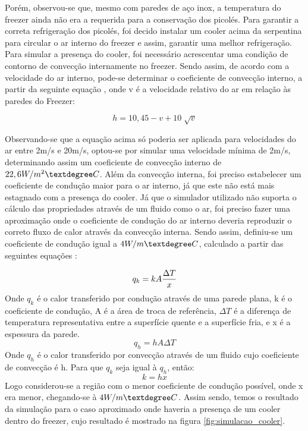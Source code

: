 \begin{itemize}
\par Porém, observou-se que, mesmo com paredes de aço inox, a temperatura do freezer ainda não era a requerida para a conservação dos picolés. Para garantir a correta refrigeração dos picolés, foi decido instalar um cooler acima da serpentina para circular o ar interno do freezer e assim, garantir uma melhor refrigeração. Para simular a presença do cooler, foi necessário acrescentar uma condição de contorno de convecção internamente no freezer. Sendo assim, de acordo com a velocidade do ar interno, pode-se determinar o coeficiente de convecção interno, a partir da seguinte equação \cite{convection}, onde v é a velocidade relativo do ar em relação às paredes do Freezer:

$$
    h = 10,45 - v + 10 \sqrt[]{v}
$$

Observando-se que a equação acima só poderia ser aplicada para velocidades do ar entre 2m/s e 20m/s, optou-se por simular uma velocidade mínima de 2m/s, determinando assim um coeficiente de convecção interno de $22,6 W/m^2\textdegree C $. Além da convecção interna, foi preciso estabelecer um coeficiente de condução maior para o ar interno, já que este não está mais estagnado com a presença do cooler. Já que o simulador utilizado não suporta o cálculo das propriedades através de um fluido como o ar, foi preciso fazer uma aproximação onde o coeficiente de condução do ar interno deveria reproduzir o correto fluxo de calor através da convecção interna. Sendo assim, definiu-se um coeficiente de condução igual a $4 W/m\textdegree C$, calculado a partir das seguintes equações \cite{equacoesCOEF}: 

$$
    q_k = kA {\Delta T\over x}
$$
Onde $q_k$ é o calor transferido por condução através de uma parede plana, k é o coeficiente de condução, A é a área de troca de referência, $ \Delta T$ é a diferença de temperatura representativa entre a superfície quente e a superfície fria, e x é a espessura da parede.
$$
    q_h = hA \Delta T
$$
Onde $q_h$ é o calor transferido por convecção através de um fluido cujo coeficiente de convecção é h. 
Para que $q_k$ seja igual à $q_h$, então:
$$
    k = hx
$$
Logo considerou-se a região com o menor coeficiente de condução possível, onde x era menor, chegando-se à $4 W/m\textdegree C$. Assim sendo, temos o resultado da simulação para o caso aproximado onde haveria a presença de um cooler dentro do freezer, cujo resultado é mostrado na figura \ref{fig:simulacao_cooler}.



\end{itemize}
